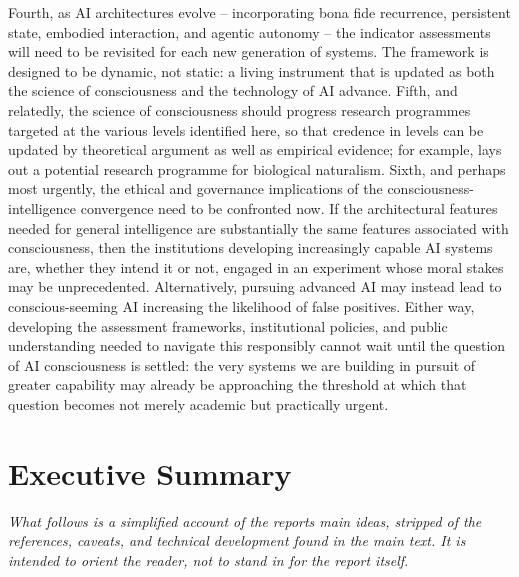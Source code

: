 \documentclass[11pt, a4paper, onecolumn, gdm]{google}
\begin{document}
Fourth, as AI architectures evolve -- incorporating bona fide recurrence, persistent state, embodied interaction, and agentic autonomy -- the indicator assessments will need to be revisited for each new generation of systems.
The framework is designed to be dynamic, not static: a living instrument that is updated as both the science of consciousness and the technology of AI advance.
Fifth, and relatedly, the science of consciousness should progress research programmes targeted at the various levels identified here, so that credence in levels can be updated by theoretical argument as well as empirical evidence; for example, \citet{seth2026stuff} lays out a potential research programme for biological naturalism.
Sixth, and perhaps most urgently, the ethical and governance implications of the consciousness-intelligence convergence need to be confronted now.
If the architectural features needed for general intelligence are substantially the same features associated with consciousness, then the institutions developing increasingly capable AI systems are, whether they intend it or not, engaged in an experiment whose moral stakes may be unprecedented.
Alternatively, pursuing advanced AI may instead lead to conscious-seeming AI increasing the likelihood of false positives. Either way, developing the assessment frameworks, institutional policies, and public understanding needed to navigate this responsibly cannot wait until the question of AI consciousness is settled: the very systems we are building in pursuit of greater capability may already be approaching the threshold at which that question becomes not merely academic but practically urgent.

\clearpage



\clearpage
\setcounter{figure}{0}
\renewcommand{\thefigure}{A\arabic{figure}}

\section{Executive Summary}\label{executive-summary}

\emph{What follows is a simplified account of the report\textquotesingle s main ideas, stripped of the references, caveats, and technical development found in the main text. It is intended to orient the reader, not to stand in for the report itself.}
\end{document}

